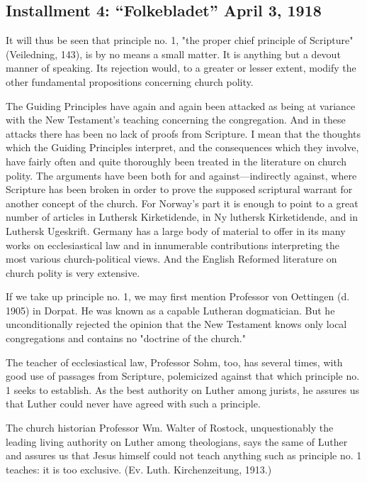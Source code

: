 

\subsection{Installment 4: “Folkebladet” April 3, 1918}




It will thus be seen that principle no. 1, "the proper chief principle of Scripture" (Veiledning, 143), is by no means a small matter. It is anything but a devout manner of speaking. Its rejection would, to a greater or lesser extent, modify the other fundamental propositions concerning church polity.

The Guiding Principles have again and again been attacked as being at variance with the New Testament’s teaching concerning the congregation. And in these attacks there has been no lack of proofs from Scripture. I mean that the thoughts which the Guiding Principles interpret, and the consequences which they involve, have fairly often and quite thoroughly been treated in the literature on church polity. The arguments have been both for and against—indirectly against, where Scripture has been broken in order to prove the supposed scriptural warrant for another concept of the church. For Norway’s part it is enough to point to a great number of articles in Luthersk Kirketidende, in Ny luthersk Kirketidende, and in Luthersk Ugeskrift. Germany has a large body of material to offer in its many works on ecclesiastical law and in innumerable contributions interpreting the most various church-political views. And the English Reformed literature on church polity is very extensive.

If we take up principle no. 1, we may first mention Professor von Oettingen (d. 1905) in Dorpat. He was known as a capable Lutheran dogmatician. But he unconditionally rejected the opinion that the New Testament knows only local congregations and contains no "doctrine of the church."

The teacher of ecclesiastical law, Professor Sohm, too, has several times, with good use of passages from Scripture, polemicized against that which principle no. 1 seeks to establish. As the best authority on Luther among jurists, he assures us that Luther could never have agreed with such a principle.

The church historian Professor Wm. Walter of Rostock, unquestionably the leading living authority on Luther among theologians, says the same of Luther and assures us that Jesus himself could not teach anything such as principle no. 1 teaches: it is too exclusive. (Ev. Luth. Kirchenzeitung, 1913.)

